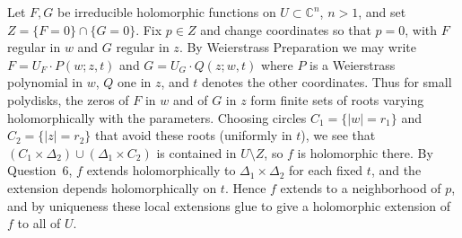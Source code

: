 \documentclass[12pt]{article}  %
\begin{document}
\begin{solution}
Let $F,G$ be irreducible holomorphic functions on $U\subset\mathbb{C}^n$, $n>1$, and set $Z=\{F=0\}\cap\{G=0\}$. Fix $p\in Z$ and change coordinates so that $p=0$, with $F$ regular in $w$ and $G$ regular in $z$. By Weierstrass Preparation we may write $F=U_F\cdot P(w;z,t)$ and $G=U_G\cdot Q(z;w,t)$ where $P$ is a Weierstrass polynomial in $w$, $Q$ one in $z$, and $t$ denotes the other coordinates. Thus for small polydisks, the zeros of $F$ in $w$ and of $G$ in $z$ form finite sets of roots varying holomorphically with the parameters. Choosing circles $C_1=\{|w|=r_1\}$ and $C_2=\{|z|=r_2\}$ that avoid these roots (uniformly in $t$), we see that $(C_1\times \Delta_2)\cup (\Delta_1\times C_2)$ is contained in $U\setminus Z$, so $f$ is holomorphic there. By Question~6, $f$ extends holomorphically to $\Delta_1\times \Delta_2$ for each fixed $t$, and the extension depends holomorphically on $t$. Hence $f$ extends to a neighborhood of $p$, and by uniqueness these local extensions glue to give a holomorphic extension of $f$ to all of $U$.
\end{solution}
\end{document}
